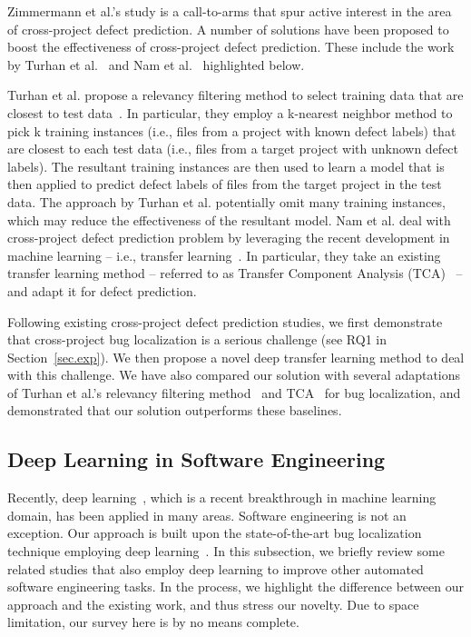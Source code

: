 Zimmermann et al.'s study is a call-to-arms that spur active interest in the area of cross-project defect prediction. A number of solutions have been proposed to boost the effectiveness of cross-project defect prediction. These include the work by Turhan et al.~\cite{TurhanMBS09} and Nam et al.~\cite{NamPK13} highlighted below. 

Turhan et al. propose a relevancy filtering method to select training data that are closest to test data~\cite{TurhanMBS09}. In particular, they employ a k-nearest neighbor method to pick k training instances (i.e., files from a project with known defect labels) that are closest to each test data (i.e., files from a target project with unknown defect labels). The resultant training instances are then used to learn a model that is then applied to predict defect labels of files from the target project in the test data. The approach by Turhan et al. potentially omit many training instances, which may reduce the effectiveness of the resultant model. Nam et al. deal with cross-project defect prediction problem by leveraging the recent development in machine learning -- i.e., transfer learning~\cite{NamPK13}. In particular, they take an existing transfer learning method -- referred to as Transfer Component Analysis (TCA)~\cite{PanTKY11} -- and adapt it for defect prediction.

Following existing cross-project defect prediction studies, we first demonstrate that cross-project bug localization is a serious challenge (see RQ1 in Section~\ref{sec.exp}). We then propose a novel deep transfer learning method to deal with this challenge. We have also compared our solution with several adaptations of Turhan et al.'s relevancy filtering method~\cite{TurhanMBS09} and TCA~\cite{PanTKY11} for bug localization, and demonstrated that our solution outperforms these baselines.


\subsection{Deep Learning in Software Engineering}\label{sec.deeplearning}

Recently, deep learning~\cite{Goodfellow-et-al-2016}, which is a recent breakthrough in machine learning domain, has been applied in many areas. Software engineering is not an exception. Our approach is built upon the state-of-the-art bug localization technique employing deep learning~\cite{huo2016learning}. In this subsection, we briefly review some related studies that also employ deep learning to improve other automated software engineering tasks. In the process, we highlight the difference between our approach and the existing work, and thus stress our novelty. Due to space limitation, our survey here is by no means complete.

